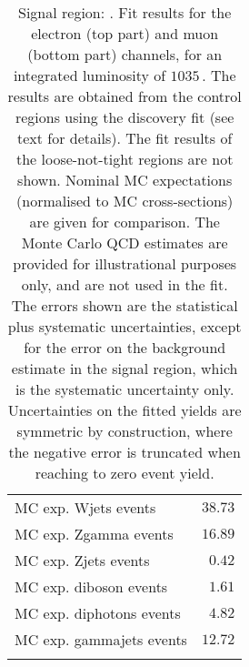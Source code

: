 \begin{table}
\begin{center}
{\begin{tabular*}{\textwidth}{@{\extracolsep{\fill}}lr}
        MC exp. Wjets events         & $38.73$              \\
        MC exp. Zgamma events         & $16.89$              \\
        MC exp. Zjets events         & $0.42$              \\
        MC exp. diboson events         & $1.61$              \\
        MC exp. diphotons events         & $4.82$              \\
        MC exp. gammajets events         & $12.72$              \\
\noalign{\smallskip}\hline\noalign{\smallskip}
\end{tabular*}
}
\end{center}
\caption{Signal region: . Fit results for the electron (top part) and muon (bottom part) channels, for an integrated luminosity of $1035$\,\ipb.
The results are obtained from the control regions using the discovery fit (see text for details). The fit results of the loose-not-tight regions are not shown.
Nominal MC expectations (normalised to MC cross-sections) are given for comparison. 
The Monte Carlo QCD estimates are provided for illustrational purposes only, and are not used in the fit.
The errors shown are the statistical plus systematic uncertainties, except for the error on the background estimate in the signal region, which is the systematic uncertainty only.
Uncertainties on the fitted yields are symmetric by construction, 
where the negative error is truncated when reaching to zero event yield.
}
\label{table.results.systematics.in.logL.fit.table.results.yields}
\end{table}
%